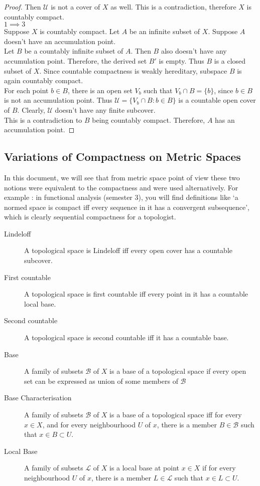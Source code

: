 \begin{proof}
	Then $\mathcal{U}$ is not a cover of $X$ as well. This is a contradiction, therefore $X$ is countably compact.\\

	$1 \implies 3$\\
	Suppose $X$ is countably compact. Let $A$ be an infinite subset of $X$. Suppose $A$ doesn't have an accumulation point.\\

	Let $B$ be a countably infinite subset of $A$. Then $B$ also doesn't have any accumulation point. Therefore, the derived set $B'$ is empty. Thus $B$ is a closed subset of $X$. Since countable compactness is weakly hereditary, subspace $B$ is again countably compact.\\

	For each point $b \in B$, there is an open set $V_b$ such that $V_b \cap B = \{ b\}$, since $b \in B$ is not an accumulation point. Thus $\mathcal{U} = \{ V_b \cap B : b \in B \}$ is a countable open cover of $B$. Clearly, $\mathcal{U}$ doesn't have any finite subcover.\\

	This is a contradiction to $B$ being countably compact. Therefore, $A$ has an accumulation point.
\end{proof}

\subsection{Variations of Compactness on Metric Spaces}
	In this document, we will see that from metric space point of view these two notions were equivalent to the compactness and were used alternatively. For example : in functional analysis (semester 3), you will find definitions like `a normed space is compact iff every sequence in it has a convergent subsequence', which is clearly sequential compactness for a topologist.

\begin{description}
	\item[Lindeloff] A topological space is Lindeloff iff every open cover has a countable subcover.
	\item[First countable] A topological space is first countable iff every point in it has a countable local base.
	\item[Second countable] A topological space is second countable iff it has a countable base.
	\item[Base] A family of subsets $\mathcal{B}$ of $X$ is a base of a topological space if every open set can be expressed as union of some members of $\mathcal{B}$
	\item[Base Characterisation] A family of subsets $\mathcal{B}$ of $X$ is a base of a topological space iff for every $x \in X$, and for every neighbourhood $U$ of $x$, there is a member $B \in \mathcal{B}$ such that $ x \in B \subset U$.
	\item[Local Base] A family of subsets $\mathcal{L}$ of $X$ is a local base at point $x \in X$ if for every neighbourhood $U$ of $x$, there is a member $L \in \mathcal{L}$ such that $x \in L \subset U$.
\end{description}

